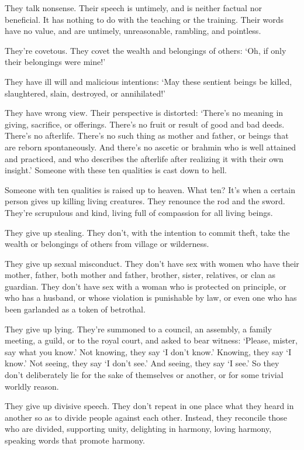 \documentclass[12pt,openany]{book}%
\begin{document}
They talk nonsense. Their speech is untimely, and is neither factual nor beneficial. It has nothing to do with the teaching or the training. Their words have no value, and are untimely, unreasonable, rambling, and pointless. 

They’re covetous. They covet the wealth and belongings of others: ‘Oh, if only their belongings were mine!’ 

They have ill will and malicious intentions: ‘May these sentient beings be killed, slaughtered, slain, destroyed, or annihilated!’ 

They have wrong view. Their perspective is distorted: ‘There’s no meaning in giving, sacrifice, or offerings. There’s no fruit or result of good and bad deeds. There’s no afterlife. There’s no such thing as mother and father, or beings that are reborn spontaneously. And there’s no ascetic or brahmin who is well attained and practiced, and who describes the afterlife after realizing it with their own insight.’ Someone with these ten qualities is cast down to hell. 

Someone with ten qualities is raised up to heaven. What ten? It’s when a certain person gives up killing living creatures. They renounce the rod and the sword. They’re scrupulous and kind, living full of compassion for all living beings. 

They give up stealing. They don’t, with the intention to commit theft, take the wealth or belongings of others from village or wilderness. 

They give up sexual misconduct. They don’t have sex with women who have their mother, father, both mother and father, brother, sister, relatives, or clan as guardian. They don’t have sex with a woman who is protected on principle, or who has a husband, or whose violation is punishable by law, or even one who has been garlanded as a token of betrothal. 

They give up lying. They’re summoned to a council, an assembly, a family meeting, a guild, or to the royal court, and asked to bear witness: ‘Please, mister, say what you know.’ Not knowing, they say ‘I don’t know.’ Knowing, they say ‘I know.’ Not seeing, they say ‘I don’t see.’ And seeing, they say ‘I see.’ So they don’t deliberately lie for the sake of themselves or another, or for some trivial worldly reason. 

They give up divisive speech. They don’t repeat in one place what they heard in another so as to divide people against each other. Instead, they reconcile those who are divided, supporting unity, delighting in harmony, loving harmony, speaking words that promote harmony. 
\end{document}
